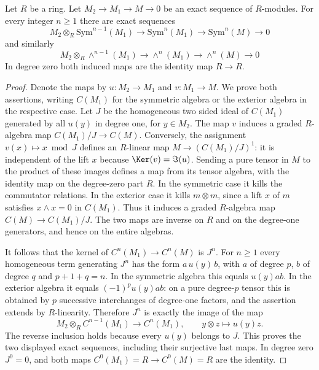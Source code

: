 \begin{lemma}
\label{editorial-source-lemma-presentation-sym-exterior}
Let $R$ be a ring.
Let $M_2 \to M_1 \to M \to 0$ be an exact sequence of $R$-modules.
For every integer $n \geq 1$ there are exact sequences
$$
M_2 \otimes_R \text{Sym}^{n - 1}(M_1)
\to
\text{Sym}^n(M_1)
\to
\text{Sym}^n(M)
\to
0
$$
and similarly
$$
M_2 \otimes_R \wedge^{n - 1}(M_1)
\to
\wedge^n(M_1)
\to
\wedge^n(M)
\to
0
$$
In degree zero both induced maps are the identity map $R \to R$.
\end{lemma}

\begin{proof}
Denote the maps by $u : M_2 \to M_1$ and $v : M_1 \to M$.
We prove both assertions, writing $C(M_1)$ for the symmetric algebra
or the exterior algebra in the respective case. Let $J$ be the
homogeneous two sided ideal of $C(M_1)$ generated by all
$u(y)$ in degree one, for $y \in M_2$.
The map $v$ induces a graded $R$-algebra map
$C(M_1)/J \to C(M)$. Conversely, the assignment
$v(x) \mapsto x \bmod J$ defines an $R$-linear map
$M \to (C(M_1)/J)^1$: it is independent of the lift $x$
because $\Ker(v) = \Im(u)$. Sending a pure tensor in $M$
to the product of these images defines a map from its tensor algebra,
with the identity map on the degree-zero part $R$.
In the symmetric case it kills the commutator relations.
In the exterior case it kills $m\otimes m$, since a lift $x$ of $m$
satisfies $x\wedge x = 0$ in $C(M_1)$.
Thus it induces a graded $R$-algebra map
$C(M) \to C(M_1)/J$. The two maps are inverse on $R$ and on
the degree-one generators, and hence on the entire algebras.

\medskip\noindent
It follows that the kernel of $C^n(M_1) \to C^n(M)$ is $J^n$.
For $n \geq 1$ every homogeneous term generating $J^n$ has the form
$a\,u(y)\,b$, with $a$ of degree $p$, $b$ of degree $q$ and
$p+1+q=n$. In the symmetric algebra this equals $u(y)ab$.
In the exterior algebra it equals $(-1)^p u(y)ab$:
on a pure degree-$p$ tensor this is obtained by $p$ successive
interchanges of degree-one factors, and the assertion extends by
$R$-linearity. Therefore $J^n$ is exactly the image of the map
$$
M_2\otimes_R C^{n-1}(M_1) \longrightarrow C^n(M_1),
\qquad y\otimes z \longmapsto u(y)z.
$$
The reverse inclusion holds because every $u(y)$ belongs to $J$.
This proves the two displayed exact sequences, including their
surjective last maps. In degree zero $J^0=0$, and both maps
$C^0(M_1)=R \to C^0(M)=R$ are the identity.
\end{proof}
